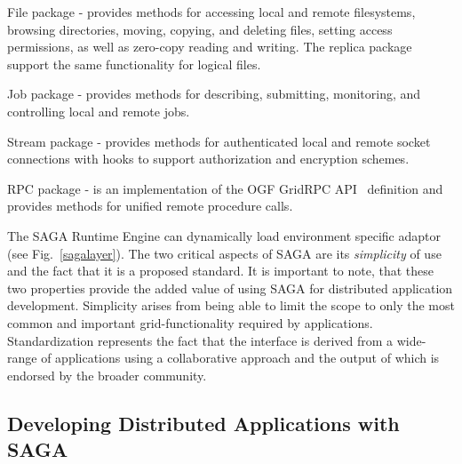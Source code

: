\documentclass{llncs}
\begin{document}

\begin{compactitem}
\item File package - provides methods for accessing local and remote
  filesystems, browsing directories, moving, copying, and deleting
  files, setting access permissions, as well as zero-copy reading and
  writing. The replica package support the same functionality for logical files.
\item Job package - provides methods for describing, submitting,
  monitoring, and controlling local and remote jobs. %
\item Stream package - provides methods for authenticated local and
  remote socket connections with hooks to support authorization and
  encryption schemes.
\item RPC package - is an implementation of the OGF GridRPC
  API~\cite{gridrpc_url} definition and provides methods for unified
  remote procedure calls.
\end{compactitem}

The SAGA Runtime Engine can dynamically load environment specific
adaptor (see Fig.~\ref{sagalayer}).  The two critical aspects of SAGA are its
{\it simplicity} of use and the fact that it is a proposed standard.
It is important to note, that these two properties provide the added
value of using SAGA for distributed application development.
Simplicity arises from being able to limit the scope to only the most
common and important grid-functionality required by applications.
Standardization represents the fact that the interface is derived from
a wide-range of applications using a collaborative approach and the
output of which is endorsed by the broader community.

\upp

\subsection{Developing Distributed Applications with SAGA}
\end{document}
